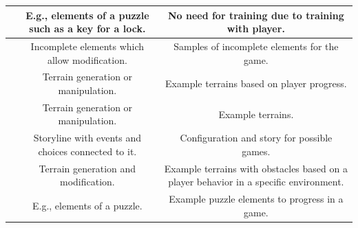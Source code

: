 \documentclass[MGS,Master,english]{twbook}%
\begin{document}
\begin{landscape}
\begin{table}[tp]
{\begin{tabular}{c|c|c|}
				\multicolumn{1}{|c||}{\nameref{idea::trainToProgress}}        & E.g., elements of a puzzle such as a key for a lock. & No need for training due to training with player.                                     \\ \hline
				\multicolumn{1}{|c||}{\nameref{idea::buildingWithAssistance}} & Incomplete elements which allow modification.        & Samples of incomplete elements for the game.                                          \\ \hline
				\multicolumn{1}{|c||}{\nameref{idea::exploringCoWorker}}      & Terrain generation or manipulation.                  & Example terrains based on player progress.                                            \\ \hline
				\multicolumn{1}{|c||}{\nameref{idea::observeAndLearn}}        & Terrain generation or manipulation.                  & Example terrains.                                                                     \\ \hline
				\multicolumn{1}{|c||}{\nameref{idea::expressYourself}}        & Storyline with events and choices connected to it.   & Configuration and story for possible games.                                           \\ \hline
				\multicolumn{1}{|c||}{\nameref{idea::bigBossHelper}}          & Terrain generation and modification.                 & Example terrains with obstacles based on a player behavior in a specific environment. \\ \hline
				\multicolumn{1}{|c||}{\nameref{idea::figureItOut}}            & E.g., elements of a puzzle.                          & Example puzzle elements to progress in a game.                                        \\ \hline
			\end{tabular}%
		}
	\end{table}
\end{landscape}
\end{document}

